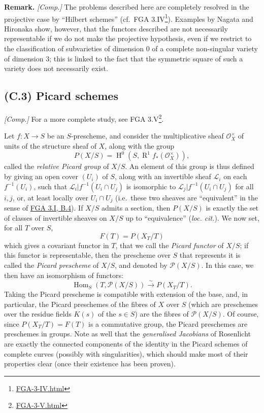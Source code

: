 \documentclass{article}
\renewcommand{\href}[2]{#2\footnote{\url{#1}}}
\newenvironment{rmenv}[1]
  {\phantomsection\par\smallskip\noindent\textbf{#1.}\rmfamily}
  {\par\smallskip}
\newcommand{\oldpage}[1]{\marginpar{\footnotesize$\Big\vert$ \textit{p.~#1}}}
\theoremstyle{definition}
\theoremstyle{definition}
\theoremstyle{definition}
\theoremstyle{definition}
\theoremstyle{remark}
\begin{document}
\begin{rmenv}{Remark}
\emph{{[}Comp.{]}}
The problems described here are completely resolved in the projective case by ``Hilbert schemes'' (cf.~\href{FGA-3-IV.html}{FGA 3.IV}).
Examples by Nagata and Hironaka show, however, that the functors described are not necessarily representable if we do not make the projective hypothesis, even if we restrict to the classification of subvarieties of dimension \(0\) of a complete non-singular variety of dimension \(3\);
this is linked to the fact that the symmetric square of such a variety does not necessarily exist.

\end{rmenv}

\hypertarget{fga-3-ii-section-C.3}{%
\subsection{(C.3) Picard schemes}\label{fga-3-ii-section-C.3}}

\emph{{[}Comp.{]}} For a more complete study, see \href{FGA-3-V.html}{FGA 3.V}.

Let \(f\colon X\to S\) be an \(S\)-prescheme, and consider the multiplicative sheaf \({\mathscr{O}}_X^\times\) of units of the structure sheaf of \(X\), along with the group
\[
  P(X/S) = \operatorname{H}^0(S,\operatorname{R}^1f_*({\mathscr{O}}_X^\times)),
\]
called the \emph{relative Picard group} of \(X/S\).
An element of this group is thus defined by giving an open cover \((U_i)\) of \(S\), along with an invertible sheaf \({\mathscr{L}}_i\) on each \(f^{-1}(U_i)\), such that \({\mathscr{L}}_i|f^{-1}(U_i\cap U_j)\) is isomorphic to \({\mathscr{L}}_j|f^{-1}(U_i\cap U_j)\) for all \(i,j\), or, at least locally over \(U_i\cap U_j\) (i.e.~these two sheaves are ``equivalent'' in the sense of \protect\hyperlink{fga-3-i-section-B.4}{FGA 3.I, B.4}).
If \(X/S\) admits a section, then \(P(X/S)\) is exactly the set of classes of invertible sheaves on \(X/S\) up to ``equivalence'' (\emph{loc. cit.}).
We now set, for all \(T\) over \(S\),
\[
  F(T) = P(X_T/T)
\]
which gives a covariant functor in \(T\), that we call the \emph{Picard functor} of \(X/S\);
if this functor is representable, then the prescheme over \(S\) that represents it is called the \emph{Picard prescheme} of \(X/S\), and denoted by \({\mathscr{P}}(X/S)\).
In this case, we then have an isomorphism of functors:
\[
  \operatorname{Hom}_S(T,{\mathscr{P}}(X/S)) \xrightarrow{\sim}P(X_T/T).
\]
Taking the Picard prescheme is compatible with extension of the base, and, in particular, the Picard preschemes of the fibres of \(X\) over \(S\) (which are preschemes over the residue fields \(K(s)\) of the \(s\in S\)) are the fibres of \({\mathscr{P}}(X/S)\).
\oldpage{195-16}Of course, since \(P(X_T/T)=F(T)\) is a commutative group, the Picard preschemes are preschemes in groups.
Note as well that the \emph{generalised Jacobians} of Rosenlicht are exactly the connected components of the identity in the Picard schemes of complete curves (possibly with singularities), which should make most of their properties clear (once their existence has been proven).
\end{document}
